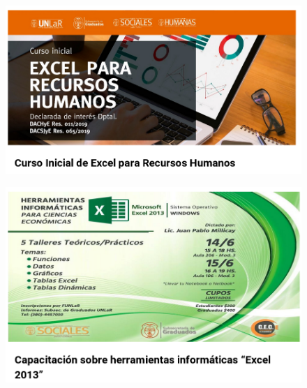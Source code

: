 \documentclass{fancyslides}
\begin{document}
\begin{frame}
\begin{figure}
	\centering
	\includegraphics[width=1\linewidth]{images/excel2}
	\label{fig:excel2}
\end{figure}

\end{frame}

\begin{frame}
	\begin{figure}
		\centering
		\includegraphics[width=1\linewidth]{images/excel3}
		\label{fig:excel3}
	\end{figure}
	
\end{frame}
\end{document}
